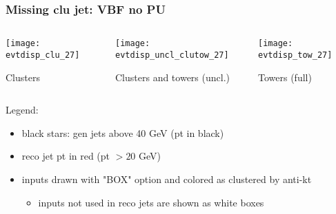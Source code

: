 \documentclass[8pt]{beamer}
\begin{document}
 \begin{frame}
  \frametitle{Missing clu jet: VBF no PU}
  
  \begin{columns}
   \begin{column}{0.4\textwidth}
    \texttt{[image: evtdisp\_clu\_27]}
    
    \small Clusters
   \end{column}
   \begin{column}{0.4\textwidth}
    \texttt{[image: evtdisp\_uncl\_clutow\_27]}
    
    \small Clusters and towers (uncl.)
   \end{column}
   \begin{column}{0.4\textwidth}
    \texttt{[image: evtdisp\_tow\_27]}
    
    \small Towers (full)
   \end{column}
  \end{columns}
  
  \vspace{20pt}

  Legend:
  
  \begin{itemize}
   \item black stars: gen jets above 40 GeV (pt in black)
   \item reco jet pt in red (pt $>20$ GeV)
   \item inputs drawn with "BOX" option and colored as clustered by anti-kt
   \begin{itemize}
    \item inputs not used in reco jets are shown as white boxes
   \end{itemize}
  \end{itemize}

 \end{frame}
\end{document}
